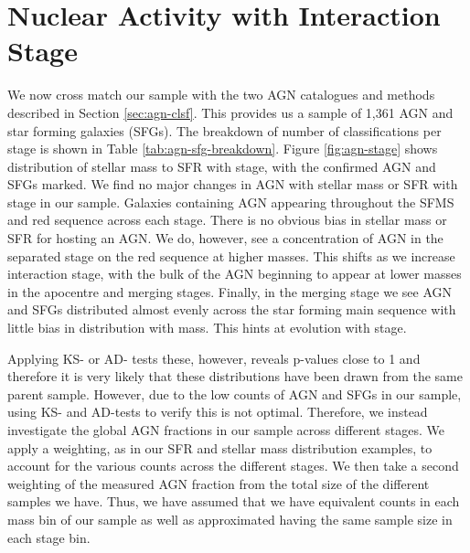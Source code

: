 \section{Nuclear Activity with Interaction Stage}\label{results:AGN_stage}
\noindent We now cross match our sample with the two AGN catalogues and methods described in Section \ref{sec:agn-clsf}. This provides us a sample of 1,361 AGN and star forming galaxies (SFGs). The breakdown of number of classifications per stage is shown in Table \ref{tab:agn-sfg-breakdown}. Figure \ref{fig:agn-stage} shows distribution of stellar mass to SFR with stage, with the confirmed AGN and SFGs marked. We find no major changes in AGN with stellar mass or SFR with stage in our sample. Galaxies containing AGN appearing throughout the SFMS and red sequence across each stage. There is no obvious bias in stellar mass or SFR for hosting an AGN. We do, however, see a concentration of AGN in the separated stage on the red sequence at higher masses. This shifts as we increase interaction stage, with the bulk of the AGN beginning to appear at lower masses in the apocentre and merging stages. Finally, in the merging stage we see AGN and SFGs distributed almost evenly across the star forming main sequence with little bias in distribution with mass. This hints at evolution with stage.

Applying KS- or AD- tests these, however, reveals p-values close to 1 and therefore it is very likely that these distributions have been drawn from the same parent sample. However, due to the low counts of AGN and SFGs in our sample, using KS- and AD-tests to verify this is not optimal. Therefore, we instead investigate the global AGN fractions in our sample across different stages. We apply a weighting, as in our SFR and stellar mass distribution examples, to account for the various counts across the different stages. We then take a second weighting of the measured AGN fraction from the total size of the different samples we have. Thus, we have assumed that we have equivalent counts in each mass bin of our sample as well as approximated having the same sample size in each stage bin.


